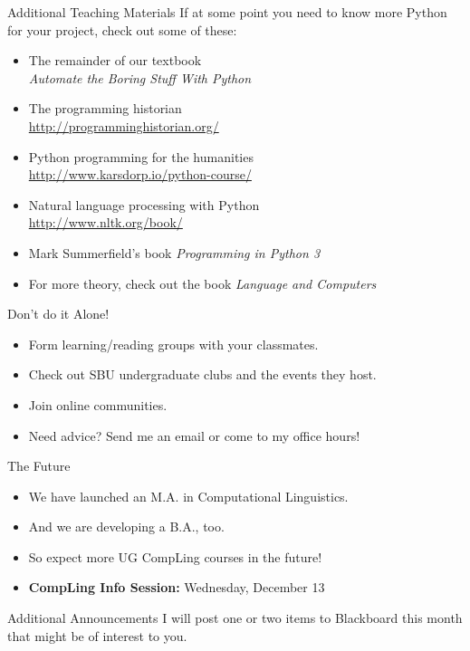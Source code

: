 \documentclass[xcolor={usenames,svgnames,x11names,dvipsnames,table}]{beamer}
\begin{document}
\begin{frame}{Additional Teaching Materials}
    If at some point you need to know more Python for your project,
    check out some of these:

    \begin{itemize}
        \item The remainder of our textbook\\
                \emph{Automate the Boring Stuff With Python}
        \item The programming historian\\
            \href{http://programminghistorian.org/}{http://programminghistorian.org/}
        \item Python programming for the humanities\\
            \href{http://www.karsdorp.io/python-course/}{http://www.karsdorp.io/python-course/}
        \item Natural language processing with Python\\
            \href{http://www.nltk.org/book/}{http://www.nltk.org/book/}
        \item Mark Summerfield's book \emph{Programming in Python 3}
        \item For more theory, check out the book \emph{Language and Computers}
    \end{itemize}
\end{frame}

\begin{frame}{Don't do it Alone!}
    \begin{itemize}
        \item Form learning\slash reading groups with your classmates.
        \item Check out SBU undergraduate clubs and the events they host.
        \item Join online communities.
        \item Need advice?
            Send me an email or come to my office hours!
    \end{itemize}
\end{frame}

\begin{frame}{The Future}
    \begin{itemize}
        \item We have launched an M.A. in Computational Linguistics. 
        \item And we are developing a B.A., too.
        \item So expect more UG CompLing courses in the future!
        \item \textbf{CompLing Info Session:} Wednesday, December 13
    \end{itemize}

    \begin{block}{Additional Announcements}
        I will post one or two items to Blackboard this month\\
        that might be of interest to you.
    \end{block}
\end{frame}
\end{document}
